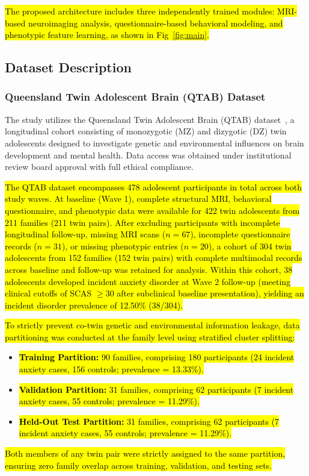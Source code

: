 \documentclass[10pt,letterpaper]{article}
\begin{document}
        \hl{The proposed architecture includes three independently trained modules: MRI-based neuroimaging analysis, questionnaire-based behavioral modeling, and phenotypic feature learning, as shown in Fig~\ref{fig:main}.}

        \subsection*{Dataset Description}

        \subsubsection*{\textbf{Queensland Twin Adolescent Brain (QTAB) Dataset}}

        The study utilizes the Queensland Twin Adolescent Brain (QTAB) dataset~\cite{ref31}, a longitudinal cohort consisting of monozygotic (MZ) and dizygotic (DZ) twin adolescents designed to investigate genetic and environmental influences on brain development and mental health. Data access was obtained under institutional review board approval with full ethical compliance.

        \hl{The QTAB dataset encompasses 478 adolescent participants in total across both study waves. At baseline (Wave 1), complete structural MRI, behavioral questionnaire, and phenotypic data were available for 422 twin adolescents from 211 families (211 twin pairs). After excluding participants with incomplete longitudinal follow-up, missing MRI scans ($n = 67$), incomplete questionnaire records ($n = 31$), or missing phenotypic entries ($n = 20$), a cohort of 304 twin adolescents from 152 families (152 twin pairs) with complete multimodal records across baseline and follow-up was retained for analysis. Within this cohort, 38 adolescents developed incident anxiety disorder at Wave 2 follow-up (meeting clinical cutoffs of SCAS $\ge 30$ after subclinical baseline presentation), yielding an incident disorder prevalence of 12.50\% (38/304).}

        \hl{To strictly prevent co-twin genetic and environmental information leakage, data partitioning was conducted at the family level using stratified cluster splitting:}
        \begin{itemize}
            \item \hl{\textbf{Training Partition:} 90 families, comprising 180 participants (24 incident anxiety cases, 156 controls; prevalence = 13.33\%).}
            \item \hl{\textbf{Validation Partition:} 31 families, comprising 62 participants (7 incident anxiety cases, 55 controls; prevalence = 11.29\%).}
            \item \hl{\textbf{Held-Out Test Partition:} 31 families, comprising 62 participants (7 incident anxiety cases, 55 controls; prevalence = 11.29\%).}
        \end{itemize}
        \hl{Both members of any twin pair were strictly assigned to the same partition, ensuring zero family overlap across training, validation, and testing sets.}
\end{document}
